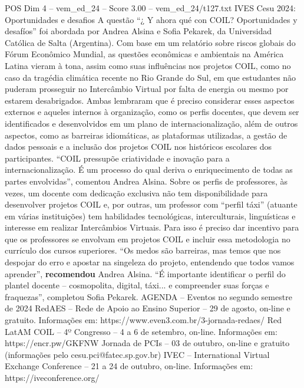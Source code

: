 \begin{textsample}{POS Dim 4 – vem\_ed\_24 – Score 3.00 – vem\_ed\_24/t127.txt}  \label{ex:f4_pos_104}
IVES Cesu 2024: Oportunidades e desafios A questão “¿ Y ahora qué con COIL?
Oportunidades y desafíos” foi abordada por Andrea Alsina e Sofia Pekarek, da Universidad Católica de Salta (Argentina).
Com base em um relatório sobre riscos globais do Fórum Econômico Mundial, as questões econômicas e ambientais na América Latina vieram à tona, assim como suas influências nos projetos COIL, como no caso da tragédia climática recente no Rio Grande do Sul, em que estudantes não puderam prosseguir no Intercâmbio Virtual por falta de energia ou mesmo por estarem desabrigados.
Ambas lembraram que é preciso considerar esses aspectos externos e aqueles internos à organização, como os perfis docentes, que devem ser identificados e desenvolvidos em um plano de internacionalização, além de outros aspectos, como as barreiras idiomáticas, as plataformas utilizadas, a gestão de dados pessoais e a inclusão dos projetos COIL nos históricos escolares dos participantes. “COIL pressupõe criatividade e inovação para a internacionalização.
É um processo do qual deriva o enriquecimento de todas as partes envolvidas”, comentou Andrea Alsina.
Sobre os perfis de professores, às vezes, um docente com dedicação exclusiva não tem disponibilidade para desenvolver projetos COIL e, por outras, um professor com “perfil táxi” (atuante em várias instituições) tem habilidades tecnológicas, interculturais, linguísticas e interesse em realizar Intercâmbios Virtuais.
Para isso é preciso dar incentivo para que os professores se envolvam em projetos COIL e incluir essa metodologia no currículo dos cursos superiores. “Os medos são barreiras, mas temos que nos despojar do erro e apostar na singeleza do projeto, entendendo que todos vamos aprender”, \textbf{recomendou} Andrea Alsina. “É importante identificar o perfil do plantel docente – cosmopolita, digital, táxi... e compreender suas forças e fraquezas”, completou Sofia Pekarek.
AGENDA – Eventos no segundo semestre de 2024 RedAES – Rede de Apoio ao Ensino Superior – 29 de agosto, on-line e gratuito.
Informações em: https://www.even3.com.br/3-jornada-redaes/ Red LatAM COIL – 4º Congresso – 4 a 6 de setembro, on-line.
Informações em: https://encr.pw/GKFNW Jornada de PCIs – 03 de outubro, on-line e gratuito (informações pelo cesu.pci@fatec.sp.gov.br) IVEC – International Virtual Exchange Conference – 21 a 24 de outubro, on-line.
Informações em: https://iveconference.org/

\end{textsample}
